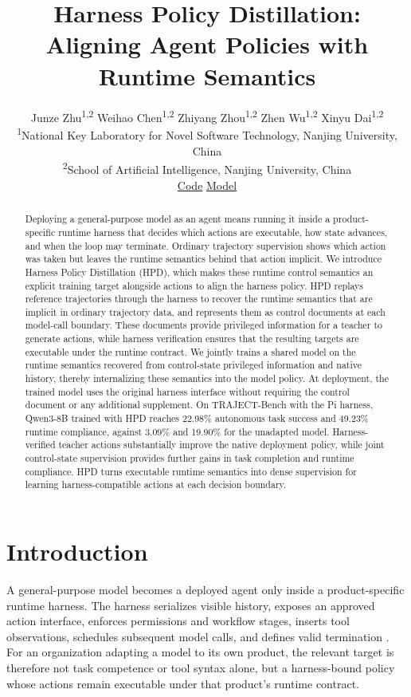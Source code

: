 \documentclass{article}
\title{Harness Policy Distillation: Aligning Agent Policies with Runtime Semantics}
\author{%
  Junze Zhu\textsuperscript{1,2}\quad
  Weihao Chen\textsuperscript{1,2}\quad
  Zhiyang Zhou\textsuperscript{1,2}\quad
  Zhen Wu\textsuperscript{1,2}\quad
  Xinyu Dai\textsuperscript{1,2}\\[6pt]
  {\fontsize{9}{11}\selectfont\textsuperscript{1}National Key Laboratory for Novel Software Technology, Nanjing University, China}\\
  {\fontsize{9}{11}\selectfont\textsuperscript{2}School of Artificial Intelligence, Nanjing University, China}\\[7pt]
  {\small\href{https://github.com/HuiCir/HPD}{\githubicon\enspace Code}\quad\textbar\quad
  \href{https://huggingface.co/Migraine/Pi-Qwen3-8B}{\hficon\enspace Model}}
}
\date{}
\newcommand{\hpd}{\textsc{HPD}}
\begin{document}
\maketitle
\raggedbottom

\begin{abstract}
Deploying a general-purpose model as an agent means running it inside a
product-specific runtime harness that decides which actions are executable, how
state advances, and when the loop may terminate. 
Ordinary trajectory supervision shows which action was taken but leaves the runtime semantics behind that action implicit. 
We introduce Harness Policy
Distillation (\hpd), which makes these runtime control semantics an explicit training target alongside actions to align the harness policy. 
HPD replays reference trajectories through the harness to recover the runtime semantics that are implicit in ordinary trajectory data, and represents them as control documents at each model-call boundary. These documents provide privileged information for a teacher to generate actions, while harness verification ensures that the resulting targets are executable under the runtime contract. We jointly trains a shared model on the runtime semantics recovered from control-state privileged information and native history, thereby internalizing these semantics into the model policy. At deployment, the trained model uses the original harness interface without requiring the control document or any additional supplement. 
On TRAJECT-Bench with the Pi harness,
Qwen3-8B trained with
\hpd{} reaches 22.98\% autonomous task success and 49.23\% runtime compliance,
against 3.09\% and 19.90\% for the unadapted model. Harness-verified teacher actions substantially improve the native deployment policy, while joint control-state supervision provides further gains in task completion and runtime compliance. HPD turns executable runtime semantics into dense supervision for learning harness-compatible actions at each decision boundary.
\end{abstract}

\section{Introduction}

A general-purpose model becomes a deployed agent only inside a product-specific
runtime harness. The harness serializes visible history, exposes an approved
action interface, enforces permissions and workflow stages, inserts tool
observations, schedules subsequent model calls, and defines valid termination
\citep{yang2024sweagent,wang2025openhands}. For an organization adapting a model
to its own product, the relevant target is therefore not task competence or tool
syntax alone, but a harness-bound policy whose actions remain executable under
that product's runtime contract.
\end{document}
